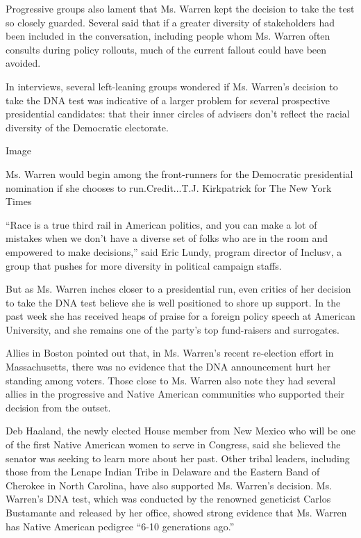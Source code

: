 Progressive groups also lament that Ms. Warren kept the decision to take
the test so closely guarded. Several said that if a greater diversity of
stakeholders had been included in the conversation, including people
whom Ms. Warren often consults during policy rollouts, much of the
current fallout could have been avoided.

In interviews, several left-leaning groups wondered if Ms. Warren's
decision to take the DNA test was indicative of a larger problem for
several prospective presidential candidates: that their inner circles of
advisers don't reflect the racial diversity of the Democratic
electorate.

Image

Ms. Warren would begin among the front-runners for the Democratic
presidential nomination if she chooses to run.Credit...T.J. Kirkpatrick
for The New York Times

``Race is a true third rail in American politics, and you can make a lot
of mistakes when we don't have a diverse set of folks who are in the
room and empowered to make decisions,'' said Eric Lundy, program
director of Inclusv, a group that pushes for more diversity in political
campaign staffs.

But as Ms. Warren inches closer to a presidential run, even critics of
her decision to take the DNA test believe she is well positioned to
shore up support. In the past week she has received heaps of praise for
a foreign policy speech at American University, and she remains one of
the party's top fund-raisers and surrogates.

Allies in Boston pointed out that, in Ms. Warren's recent re-election
effort in Massachusetts, there was no evidence that the DNA announcement
hurt her standing among voters. Those close to Ms. Warren also note they
had several allies in the progressive and Native American communities
who supported their decision from the outset.

Deb Haaland, the newly elected House member from New Mexico who will be
one of the first Native American women to serve in Congress, said she
believed the senator was seeking to learn more about her past. Other
tribal leaders, including those from the Lenape Indian Tribe in Delaware
and the Eastern Band of Cherokee in North Carolina, have also supported
Ms. Warren's decision. Ms. Warren's DNA test, which was conducted by the
renowned geneticist Carlos Bustamante and released by her office, showed
strong evidence that Ms. Warren has Native American pedigree ``6-10
generations ago.''

